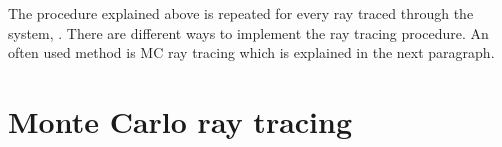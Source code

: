 The procedure explained above is repeated for every ray traced through the system, \cite{Gross2005Handbook}. There are different ways to implement the ray tracing procedure.
An often used method is MC ray tracing which is explained in the next paragraph.
\section{Monte Carlo ray tracing}
%
%


